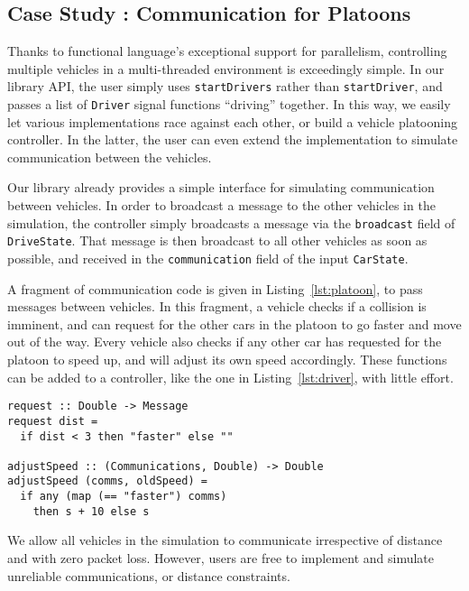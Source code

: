 \subsection{Case Study : Communication for Platoons}

Thanks to functional language's exceptional support for parallelism, controlling multiple vehicles in a multi-threaded environment is exceedingly simple. 
In our library API, the user simply uses \texttt{startDrivers} rather than \texttt{startDriver}, and passes a list of \texttt{Driver} signal functions ``driving'' together.
In this way, we easily let various implementations race against each other, or build a vehicle platooning controller.
In the latter, the user can even extend the implementation to simulate communication between the vehicles.

Our library already provides a simple interface for simulating communication between vehicles.
In order to broadcast a message to the other vehicles in the simulation, the controller simply broadcasts a message via the \texttt{broadcast} field of \texttt{DriveState}.
That message is then broadcast to all other vehicles as soon as possible, and received in the \texttt{communication} field of the input \texttt{CarState}.

A fragment of communication code is given in Listing~\ref{lst:platoon}, to pass messages between vehicles. 
In this fragment, a vehicle checks if a collision is imminent, and can request for the other cars in the platoon to go faster and move out of the way.
Every vehicle also checks if any other car has requested for the platoon to speed up, and will adjust its own speed accordingly.
These functions can be added to a controller, like the one in Listing~\ref{lst:driver}, with little effort.

\begin{lstlisting}[float,floatplacement=T,caption=Communicating between controllers, label=lst:platoon]
request :: Double -> Message
request dist = 
  if dist < 3 then "faster" else ""

adjustSpeed :: (Communications, Double) -> Double
adjustSpeed (comms, oldSpeed) =
  if any (map (== "faster") comms)
    then s + 10 else s
\end{lstlisting}

We allow all vehicles in the simulation to communicate irrespective of distance and with zero packet loss.
However, users are free to implement and simulate unreliable communications, or distance constraints.  

